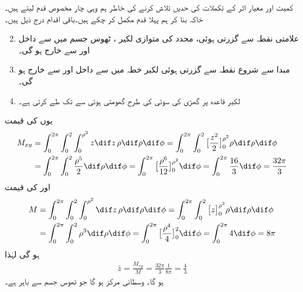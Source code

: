 کمیت اور معیار اثر کے تکملات کی حدیں تلاش کرنے کی خاطر  ہم وہی چار مخصوص قدم لیتے ہیں۔  خاکہ بنا  کر ہم پہلا قدم مکمل کر چکے ہیں۔باقی اقدام  درج ذیل  ہیں۔
\begin{enumerate}
 \setcounter{enumi}{1}
\item
{}\quad
علامتی نقطہ  سے گزرتی ہوئی، محدد  کی متوازی  لکیر ،  ٹھوس جسم میں   سے  داخل اور   سے  خارج ہو گی۔ 
\item
{}\quad
مبدا سے شروع نقطہ  سے گزرتی ہوئی لکیر  خطہ  میں  سے داخل اور  سے خارج ہو گی۔
\item
{}\quad
لکیر  قاعدہ پر گھڑی کی سوئی کی طرح گھومتی  ہوئی     سے   تک طے کرتی ہے۔
\end{enumerate}
یوں  کی قیمت
\begin{align*} 
 M_{xy}&=\int_0^{2\pi}\int_0^{2}\int_0^{\rho^2}z\dif z \,\rho\dif \rho\dif \phi =\int_0^{2\pi}\int_0^2\big[\frac{z^2}{2}\big]_{0}^{\rho^2} \rho\dif \rho\dif \phi\\
&=\int_0^{2\pi}\int_0^2\frac{\rho^5}{2}\dif \rho\dif \phi=\int_0^{2\pi}\big[\frac{\rho^6}{12}\big]_0^{\rho^2}\dif \phi=\int_0^{2\pi}\frac{16}{3}\dif\phi=\frac{32\pi}{3}
\end{align*}
اور  کی قیمت
\begin{align*}
M&=\int_0^{2\pi}\int_0^2\int_0^{\rho^2}\dif z \,\rho\dif \rho\dif \phi=\int_0^{2\pi}\int_0^2\big[z\big]_{0}^{\rho^2} \rho\dif \rho\dif \phi\\
&=\int_0^{2\pi}\int_0^2 \rho^3\dif \rho\dif \phi=\int_0^{2\pi}\big[\frac{\rho^4}{4}\big]_0^2\dif\phi=\int_0^{2\pi}4\dif\phi=8\pi
\end{align*}
ہو گی لہٰذا
\begin {align*}
\bar {z}=\frac  {M_{xy}} {M}=\frac{32\pi}{3}\frac{1}{8\pi}=\frac{4}{3}
\end {align*}
ہو گا۔ وسطانی مرکز  ہو گا جو  ٹھوس جسم سے باہر ہے۔

